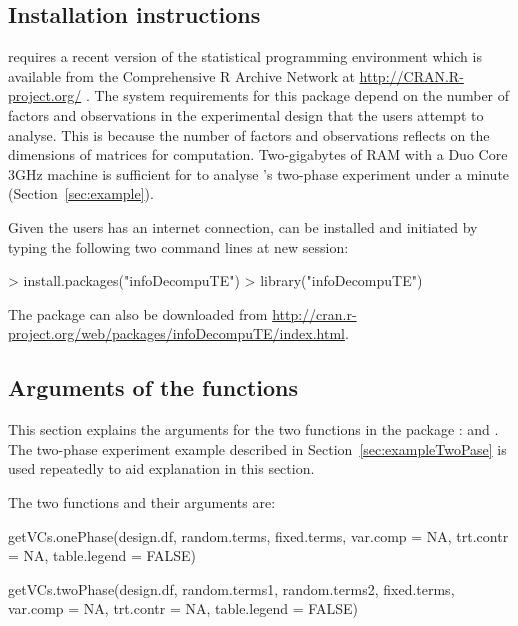 \documentclass[article]{jss}
\begin{document}
\subsection{Installation instructions}
 requires a recent version of the  statistical programming environment which is available from the Comprehensive R Archive Network at \url{http://CRAN.R-project.org/} \citep{R2010}. The system requirements for this package depend on the number of factors and observations in the experimental design that the users attempt to analyse. This is because the number of factors and observations reflects on the dimensions of matrices for computation. Two-gigabytes of RAM with a Duo Core 3GHz machine is sufficient for  to analyse \citeauthor{Brien1999}'s two-phase experiment under a minute (Section~\ref{sec:example}).

Given the users has an internet connection,  can be installed and initiated by typing the following two command lines at new  session: 
\begin{CodeChunk}
\begin{CodeInput}
> install.packages("infoDecompuTE")
> library("infoDecompuTE")
\end{CodeInput}
\end{CodeChunk}
The package can also be downloaded from \url{http://cran.r-project.org/web/packages/infoDecompuTE/index.html}.

\subsection{Arguments of the functions}
This section explains the arguments for the two functions in the package :  and . The two-phase experiment example described in Section~\ref{sec:exampleTwoPase} is used repeatedly to aid explanation in this section.

The two functions and their arguments are:
\begin{CodeChunk}
\begin{CodeInput}
getVCs.onePhase(design.df, random.terms, fixed.terms, var.comp = NA, 
trt.contr = NA, table.legend = FALSE)

getVCs.twoPhase(design.df, random.terms1, random.terms2, fixed.terms, 
var.comp = NA, trt.contr = NA, table.legend = FALSE)
\end{CodeInput}
\end{CodeChunk}
\end{document}
